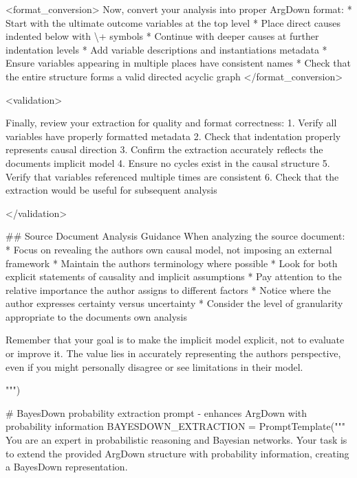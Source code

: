 \documentclass[
  11pt,
  letterpaper,
]{book}
\newenvironment{Shaded}{\begin{snugshade}}{\end{snugshade}}
\newcommand{\CommentTok}[1]{\textcolor[rgb]{0.37,0.37,0.37}{#1}}
\newcommand{\ErrorTok}[1]{\textcolor[rgb]{0.68,0.00,0.00}{#1}}
\newcommand{\NormalTok}[1]{\textcolor[rgb]{0.00,0.23,0.31}{#1}}
\newcommand{\OperatorTok}[1]{\textcolor[rgb]{0.37,0.37,0.37}{#1}}
\newcommand{\StringTok}[1]{\textcolor[rgb]{0.13,0.47,0.30}{#1}}
\begin{document}
\begin{landscape}
\begin{Shaded}
\begin{Highlighting}[]
\StringTok{\textless{}format\_conversion\textgreater{}}
\StringTok{Now, convert your analysis into proper ArgDown format:}
\StringTok{* Start with the ultimate outcome variables at the top level}
\StringTok{* Place direct causes indented below with }\ErrorTok{\textbackslash{}}\StringTok{+ symbols}
\StringTok{* Continue with deeper causes at further indentation levels}
\StringTok{* Add variable descriptions and instantiations metadata}
\StringTok{* Ensure variables appearing in multiple places have consistent names}
\StringTok{* Check that the entire structure forms a valid directed acyclic graph}
\StringTok{\textless{}/format\_conversion\textgreater{}}

\StringTok{\textless{}validation\textgreater{}}

\StringTok{Finally, review your extraction for quality and format correctness:}
\StringTok{1. Verify all variables have properly formatted metadata}
\StringTok{2. Check that indentation properly represents causal direction}
\StringTok{3. Confirm the extraction accurately reflects the document\textquotesingle{}s implicit model}
\StringTok{4. Ensure no cycles exist in the causal structure}
\StringTok{5. Verify that variables referenced multiple times are consistent}
\StringTok{6. Check that the extraction would be useful for subsequent analysis}

\StringTok{\textless{}/validation\textgreater{}}


\StringTok{\#\# Source Document Analysis Guidance}
\StringTok{When analyzing the source document:}
\StringTok{* Focus on revealing the author\textquotesingle{}s own causal model, not imposing an external framework}
\StringTok{* Maintain the author\textquotesingle{}s terminology where possible}
\StringTok{* Look for both explicit statements of causality and implicit assumptions}
\StringTok{* Pay attention to the relative importance the author assigns to different factors}
\StringTok{* Notice where the author expresses certainty versus uncertainty}
\StringTok{* Consider the level of granularity appropriate to the document\textquotesingle{}s own analysis}

\StringTok{Remember that your goal is to make the implicit model explicit, not to evaluate or improve it.}
\StringTok{The value lies in accurately representing the author\textquotesingle{}s perspective, even if you might personally disagree or see limitations in their model.}

\StringTok{"""}\NormalTok{)}

    \CommentTok{\# BayesDown probability extraction prompt {-} enhances ArgDown with probability information}
\NormalTok{    BAYESDOWN\_EXTRACTION }\OperatorTok{=}\NormalTok{ PromptTemplate(}\StringTok{"""}
\StringTok{You are an expert in probabilistic reasoning and Bayesian networks. Your task is}
\StringTok{to extend the provided ArgDown structure with probability information,}
\StringTok{creating a BayesDown representation.}


\end{Highlighting}
\end{Shaded}
\end{landscape}
\end{document}
